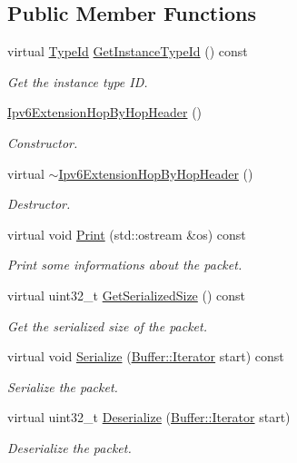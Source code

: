 \subsection*{Public Member Functions}
\begin{DoxyCompactItemize}
\item 
virtual \hyperlink{classns3_1_1TypeId}{Type\+Id} \hyperlink{classns3_1_1Ipv6ExtensionHopByHopHeader_a0e6fe555acd855b8d5a5a45402c732c9}{Get\+Instance\+Type\+Id} () const 
\begin{DoxyCompactList}\small\item\em Get the instance type ID. \end{DoxyCompactList}\item 
\hyperlink{classns3_1_1Ipv6ExtensionHopByHopHeader_a7bdeb4de540a2dbccbfa957080c6685d}{Ipv6\+Extension\+Hop\+By\+Hop\+Header} ()
\begin{DoxyCompactList}\small\item\em Constructor. \end{DoxyCompactList}\item 
virtual \hyperlink{classns3_1_1Ipv6ExtensionHopByHopHeader_a387d3e24ef3081c9867ec8364fbe14d6}{$\sim$\+Ipv6\+Extension\+Hop\+By\+Hop\+Header} ()
\begin{DoxyCompactList}\small\item\em Destructor. \end{DoxyCompactList}\item 
virtual void \hyperlink{classns3_1_1Ipv6ExtensionHopByHopHeader_ad71f5702a2dae9eb1cf4f8ae2253535f}{Print} (std\+::ostream \&os) const 
\begin{DoxyCompactList}\small\item\em Print some informations about the packet. \end{DoxyCompactList}\item 
virtual uint32\+\_\+t \hyperlink{classns3_1_1Ipv6ExtensionHopByHopHeader_a796967bac361ede79accbdc0e8c41f3f}{Get\+Serialized\+Size} () const 
\begin{DoxyCompactList}\small\item\em Get the serialized size of the packet. \end{DoxyCompactList}\item 
virtual void \hyperlink{classns3_1_1Ipv6ExtensionHopByHopHeader_aea3c87fde9d6ba5375838cbe3275361b}{Serialize} (\hyperlink{classns3_1_1Buffer_1_1Iterator}{Buffer\+::\+Iterator} start) const 
\begin{DoxyCompactList}\small\item\em Serialize the packet. \end{DoxyCompactList}\item 
virtual uint32\+\_\+t \hyperlink{classns3_1_1Ipv6ExtensionHopByHopHeader_af366694cbc19cd319d8e65700a06082f}{Deserialize} (\hyperlink{classns3_1_1Buffer_1_1Iterator}{Buffer\+::\+Iterator} start)
\begin{DoxyCompactList}\small\item\em Deserialize the packet. \end{DoxyCompactList}\end{DoxyCompactItemize}
